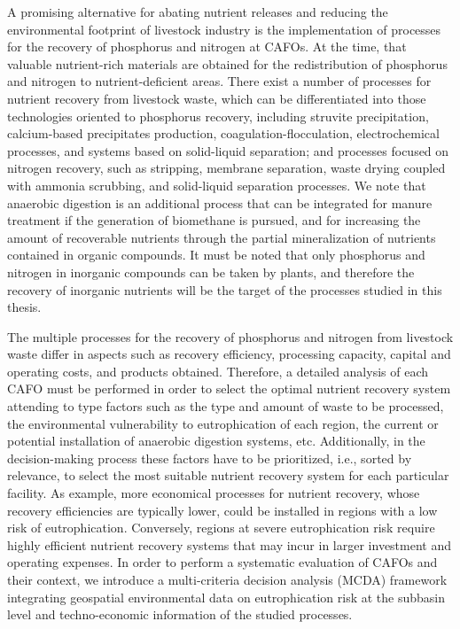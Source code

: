 \begin{refsection}[referencesCh1]
A promising alternative for abating nutrient releases and reducing the environmental footprint of livestock industry is the implementation of processes for the recovery of phosphorus and nitrogen at CAFOs. At the time, that valuable nutrient-rich materials are obtained for the redistribution of phosphorus and nitrogen to nutrient-deficient areas. There exist a number of processes for nutrient recovery from livestock waste, which can be differentiated into those technologies oriented to phosphorus recovery, including struvite precipitation, calcium-based precipitates production, coagulation-flocculation, electrochemical processes, and systems based on solid-liquid
separation; and processes focused on nitrogen recovery, such as stripping, membrane separation, waste drying coupled with ammonia scrubbing, and
solid-liquid
separation processes. We note that anaerobic digestion is an additional process that can be integrated for manure treatment if the generation of biomethane is pursued, and for increasing the amount of recoverable nutrients through the partial mineralization of nutrients contained in organic compounds. It must be noted that only phosphorus and nitrogen in inorganic compounds can be taken by plants, and therefore the recovery of inorganic nutrients will be the target of the processes studied in this thesis.

The multiple processes for the recovery of phosphorus and nitrogen from livestock waste differ in aspects such as recovery efficiency, processing capacity, capital and operating costs, and products obtained. Therefore, a detailed analysis of each CAFO must be performed in order to select the optimal nutrient recovery system attending to type factors such as the type and amount of waste to be processed, the environmental vulnerability to eutrophication of each region, the current or potential installation of anaerobic digestion systems, etc. Additionally, in the decision-making process these factors have to be prioritized, i.e., sorted by relevance, to select the most suitable nutrient recovery system for each particular facility. As example,
more economical processes for nutrient recovery, whose recovery efficiencies are typically lower, could be installed in regions with a low risk of eutrophication.
Conversely, regions at severe eutrophication risk require highly efficient nutrient recovery systems that may incur in larger investment and operating expenses. In order to perform a systematic evaluation of CAFOs and their context, we introduce a multi-criteria decision analysis (MCDA) framework integrating geospatial environmental data
on eutrophication risk at the subbasin level and
techno-economic
information of the studied processes. 


\end{refsection}
